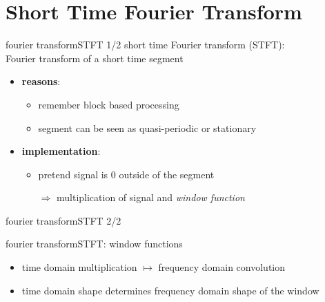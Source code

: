     \section[STFT]{Short Time Fourier Transform}
        \begin{frame}{fourier transform}{STFT 1/2}
            short time Fourier transform (STFT):\\ Fourier transform of a short time segment

            \bigskip	
                \begin{itemize}
                    \item<2->   \textbf{reasons}:
                        \begin{itemize}
                            \item	remember block based processing
                            \item	segment can be seen as quasi-periodic or stationary
                        \end{itemize}
                    \smallskip
                    \item <3->  \textbf{implementation}:
                        \begin{itemize}
                            \item   pretend signal is $0$ outside of the segment
                            \item[$\Rightarrow$] multiplication of signal and \textit{window function}
                        \end{itemize}
                \end{itemize}
        \end{frame}	
        \begin{frame}{fourier transform}{STFT 2/2}
        \end{frame}	

        \begin{frame}{fourier transform}{STFT: window functions}
            \begin{itemize}
                \item   time domain multiplication $\mapsto$ frequency domain convolution 
                \item   time domain shape determines frequency domain shape of the window
            \end{itemize}
            \vspace{70mm}
        \end{frame}	

